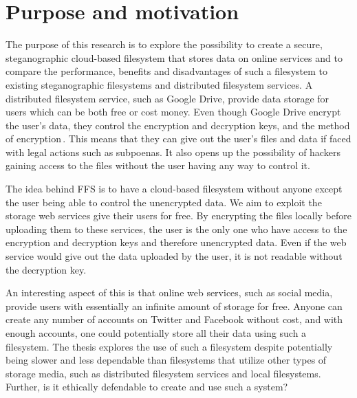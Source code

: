 
\section{Purpose and motivation}

The purpose of this research is to explore the possibility to create a secure, steganographic cloud-based filesystem that stores data on online services and to compare the performance, benefits and disadvantages of such a filesystem to existing steganographic filesystems and distributed filesystem services. A distributed filesystem service, such as Google Drive, provide data storage for users which can be both free or cost money. Even though Google Drive encrypt the user's data, they control the encryption and decryption keys, and the method of encryption\,\cite{johnsonGoogleDriveSecure2021}. This means that they can give out the user's files and data if faced with legal actions such as subpoenas. It also opens up the possibility of hackers gaining access to the files without the user having any way to control it.

The idea behind FFS is to have a cloud-based filesystem without anyone except the user being able to control the unencrypted data. We aim to exploit the storage web services give their users for free. By encrypting the files locally before uploading them to these services, the user is the only one who have access to the encryption and decryption keys and therefore unencrypted data. Even if the web service would give out the data uploaded by the user, it is not readable without the decryption key.

An interesting aspect of this is that online web services, such as social media, provide users with essentially an infinite amount of storage for free. Anyone can create any number of accounts on Twitter and Facebook without cost, and with enough accounts, one could potentially store all their data using such a filesystem. The thesis explores the use of such a filesystem despite potentially being slower and less dependable than filesystems that utilize other types of storage media, such as distributed filesystem services and local filesystems. Further, is it ethically defendable to create and use such a system?
